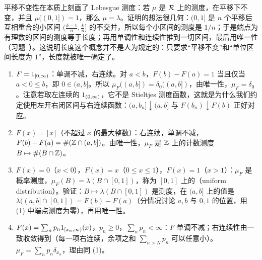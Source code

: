 \begin{remark}
平移不变性在本质上刻画了 Lebesgue 测度：若 $\mu$ 是 $\mathcal{R}$ 上的测度，在平移下不变，并且 $\mu((0,1])=1$，那么 $\mu=\lambda$。证明的想法很几何：$(0,1]$ 是 $n$ 个平移后互相重合的小区间 $(\frac{k-1}n,\frac kn]$ 的不交并，所以每个小区间的测度是 $1/n$；于是端点为有理数的区间的测度等于长度；再用单调性和连续性推到一切区间，最后用唯一性（习题~）。这说明长度这个概念并不是人为规定的：只要求“平移不变”和“单位区间长度为 $1$”，长度就被唯一确定了。
\end{remark}

\begin{example}\label{ex:extension:LS-examples}
\begin{enumerate}
\item $F=1_{[0,\infty)}$：单调不减，右连续。对 $a<b$，$F(b)-F(a)=1$ 当且仅当 $a<0\leqslant b$，即 $0\in(a,b]$。所以 $\mu_F((a,b])=\delta_0((a,b])$，由唯一性，$\mu_F=\delta_0$。注意若取左连续的 $1_{(0,\infty)}$，它不是 Stieltjes 测度函数，这就是为什么我们约定使用左开右闭区间与右连续函数：$(a,b_n]\downarrow(a,b]$ 与 $F(b_n)\downarrow F(b)$ 正好对应。
\item $F(x)=\lfloor x\rfloor$（不超过 $x$ 的最大整数）：右连续，单调不减，$F(b)-F(a)=\#(\mathbb{Z}\cap(a,b])$。由唯一性，$\mu_F$ 是 $\mathbb{Z}$ 上的计数测度 $B\mapsto\#(B\cap\mathbb{Z})$。
\item $F(x)=0$（$x<0$），$F(x)=x$（$0\leqslant x\leqslant1$），$F(x)=1$（$x>1$）：$\mu_F$ 是概率测度，$\mu_F(B)=\lambda(B\cap[0,1])$，称为 $[0,1]$ 上的（uniform distribution）。验证：$B\mapsto\lambda(B\cap[0,1])$ 是测度，在 $(a,b]$ 上的值是 $\lambda((a,b]\cap[0,1])=F(b)-F(a)$（分情况讨论 $a,b$ 与 $0,1$ 的位置，用 (1) 中端点测度为零），再用唯一性。
\item $F(x)=\sum_np_n1_{[x_n,\infty)}(x)$，$p_n\geqslant0$，$\sum_np_n<\infty$：$F$ 单调不减；右连续性由一致收敛得到（每一项右连续，余项之和 $\sum_{n>N}p_n$ 可以任意小）。$\mu_F=\sum_np_n\delta_{x_n}$，理由同 (1)。
\end{enumerate}
\end{example}

